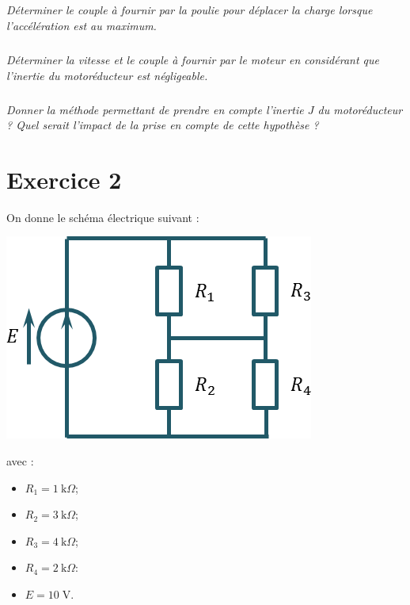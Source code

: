 \documentclass[10pt,fleqn]{book} %
\begin{document}
\begin{multicols}{2}
\subparagraph{}
\textit{Déterminer le couple à fournir par la poulie pour déplacer la charge lorsque l'accélération est au maximum. }
\ifprof
\begin{corrige}
\end{corrige}
\else
\fi


\subparagraph{}
\textit{Déterminer la vitesse et le couple à fournir par le moteur en considérant que l'inertie du motoréducteur est négligeable. }
\ifprof
\begin{corrige}
\end{corrige}
\else
\fi


\subparagraph{}
\textit{Donner la méthode permettant de prendre en compte l'inertie $J$ du motoréducteur ? Quel serait l'impact de la prise en compte de cette hypothèse ? }
\ifprof
\begin{corrige}
\end{corrige}
\else
\fi

\section*{Exercice 2}

\setcounter{subparagraph}{0}
On donne le schéma électrique suivant :
\begin{center}
\includegraphics[width=.9\linewidth]{images/fig_03}
\end{center}

avec : 
\begin{multicols}{2}
\begin{itemize}
\item $R_1 = 1 \: \text{k}\Omega$;
\item $R_2 = 3 \: \text{k}\Omega$;
\item $R_3 = 4 \: \text{k}\Omega$;
\item $R_4 = 2 \: \text{k}\Omega$:
\item $E=10 \; \text{V}$.
\end{itemize}
\end{multicols}


\end{multicols}
\end{document}
